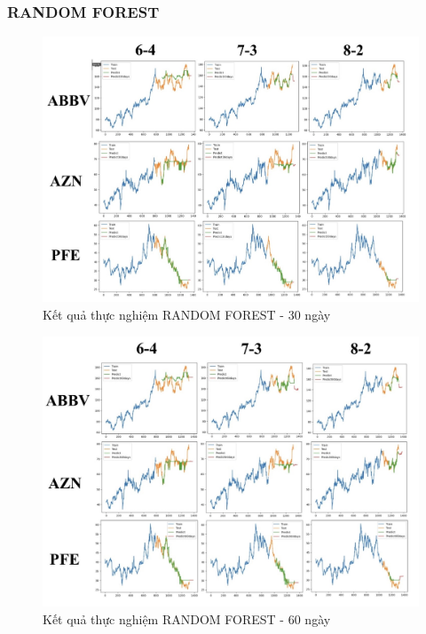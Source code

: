 \documentclass[conference]{IEEEtran}
\begin{document}
\subsubsection{RANDOM FOREST}
\begin{figure}[H]
    \centering
    \begin{minipage}{0.5\textwidth}
    \centering
    \includegraphics[width=1\textwidth]{Image/RF30.jpg}
    \caption{Kết quả thực nghiệm RANDOM FOREST - 30 ngày}
    \label{fig:1}
    \end{minipage}
\end{figure}
\begin{figure}[H]
    \centering
    \begin{minipage}{0.5\textwidth}
    \centering
    \includegraphics[width=1\textwidth]{Image/RF60.jpg}
    \caption{Kết quả thực nghiệm RANDOM FOREST - 60 ngày}
    \label{fig:1}
    \end{minipage}
\end{figure}
\end{document}
